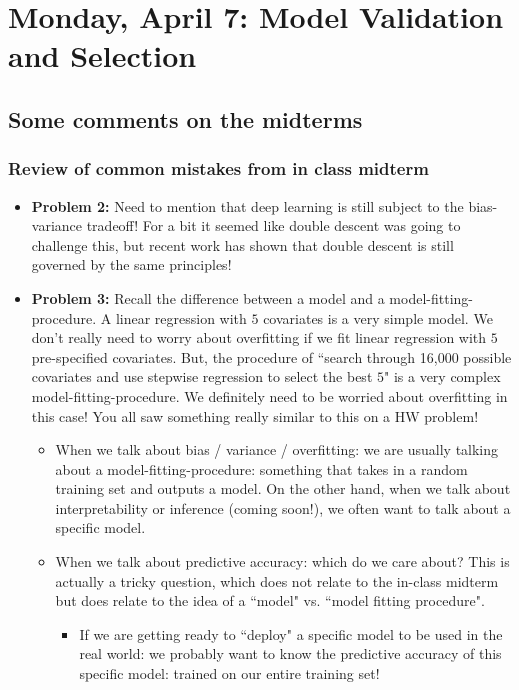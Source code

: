 \section{Monday, April 7: Model Validation and Selection}

\subsection{Some comments on the midterms}

\subsubsection{Review of common mistakes from in class midterm}
\begin{itemize}
\item \textbf{Problem 2: } Need to mention that deep learning is still subject to the bias-variance tradeoff! For a bit it seemed like double descent was going to challenge this, but recent work has shown that double descent is still governed by the same principles!
\item \textbf{Problem 3:} Recall the difference between a model and a model-fitting-procedure. A linear regression with $5$ covariates is a very simple model. We don't really need to worry about overfitting if we fit linear regression with $5$ pre-specified covariates. But, the procedure of ``search through 16,000 possible covariates and use stepwise regression to select the best $5$" is a very complex model-fitting-procedure. We definitely need to be worried about overfitting in this case! You all saw something really similar to this on a HW problem! 
\begin{itemize}
\item When we talk about bias / variance / overfitting: we are usually talking about a model-fitting-procedure: something that takes in a random training set and outputs a model. On the other hand, when we talk about interpretability or inference (coming soon!), we often want to talk about a specific model. 
\item When we talk about predictive accuracy: which do we care about? This is actually a tricky question, which does not relate to the in-class midterm but does relate to the idea of a ``model" vs. ``model fitting procedure". 
\begin{itemize}
\item If we are getting ready to ``deploy" a specific model to be used in the real world: we probably want to know the predictive accuracy of this specific model: trained on our entire training set! 

\end{itemize}
\end{itemize}
\end{itemize}
